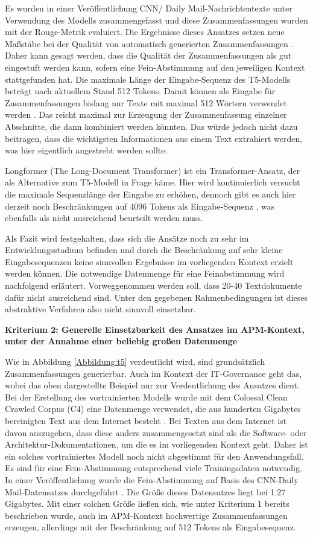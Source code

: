 Es wurden in einer Veröffentlichung CNN/ Daily Mail-Nachrichtentexte unter Verwendung des Modells zusammengefasst und diese Zusammenfassungen wurden mit der Rouge-Metrik evaluiert. Die Ergebnisse dieses Ansatzes setzen neue Maßstäbe bei der Qualität von automatisch generierten Zusammenfassungen \cite[S. 39]{Raffel}. Daher kann gesagt werden, dass die Qualität der Zusammenfassungen als gut eingestuft werden kann, sofern eine Fein-Abstimmung auf den jeweiligen Kontext stattgefunden hat. Die maximale Länge der Eingabe-Sequenz des T5-Modells beträgt nach aktuellem Stand 512 Tokens. Damit können als Eingabe für Zusammenfassungen bislang nur Texte mit maximal 512 Wörtern verwendet werden \cite[S. 39]{Raffel}. Das reicht maximal zur Erzeugung der Zusammenfassung einzelner Abschnitte, die dann kombiniert werden könnten. Das würde jedoch nicht dazu beitragen, dass die wichtigsten Informationen aus einem Text extrahiert werden, was hier eigentlich angestrebt werden sollte.

Longformer (The Long-Document Transformer) ist ein Transformer-Ansatz, der als Alternative zum T5-Modell in Frage käme. Hier wird kontinuierlich versucht die maximale Sequenzlänge der Eingabe zu erhöhen, dennoch gibt es auch hier derzeit noch Beschränkungen auf 4096 Tokens als Eingabe-Sequenz \cite{longformer} \cite{longformer2}, was ebenfalls als nicht ausreichend beurteilt werden muss.

Als Fazit wird festgehalten, dass sich die Ansätze noch zu sehr im Entwicklungsstadium befinden und durch die Beschränkung auf sehr kleine Eingabesequenzen keine sinnvollen Ergebnisse im vorliegenden Kontext erzielt werden können. Die notwendige Datenmenge für eine Feinabstimmung wird nachfolgend erläutert. Vorweggenommen werden soll, dass 20-40 Textdokumente dafür nicht ausreichend sind. Unter den gegebenen Rahmenbedingungen ist dieses abstraktive Verfahren also nicht sinnvoll einsetzbar.

{\bf Kriterium 2: Generelle Einsetzbarkeit des Ansatzes im APM-Kontext, unter der Annahme einer beliebig großen Datenmenge}

Wie in Abbildung \ref{Abbildung:t5} verdeutlicht wird, sind grundsätzlich Zusammenfassungen generierbar. Auch im Kontext der IT-Governance geht das, wobei das oben dargestellte Beispiel nur zur Verdeutlichung des Ansatzes dient. Bei der Erstellung des vortrainierten Modells wurde mit dem Colossal Clean Crawled Corpus (C4) eine Datenmenge verwendet, die aus hunderten Gigabytes bereinigten Text aus dem Internet besteht \cite[S. 5-7]{Raffel}. Bei Texten aus dem Internet ist davon auszugehen, dass diese anders zusammengesetzt sind als die Software- oder Architektur-Dokumentationen, um die es im vorliegenden Kontext geht. Daher ist ein solches vortrainiertes Modell noch nicht abgestimmt für den Anwendungsfall. Es sind für eine Fein-Abstimmung entsprechend viele Trainingsdaten notwendig. In einer Veröffentlichung wurde die Fein-Abstimmung auf Basis des CNN-Daily Mail-Datensatzes durchgeführt \cite[S. 37]{Raffel}. Die Größe dieses Datensatzes liegt bei 1.27 Gigabytes. Mit einer solchen Größe ließen sich, wie unter Kriterium 1 bereits beschrieben wurde, auch im APM-Kontext hochwertige Zusammenfassungen erzeugen, allerdings mit der Beschränkung auf 512 Tokens als Eingabesequenz.

